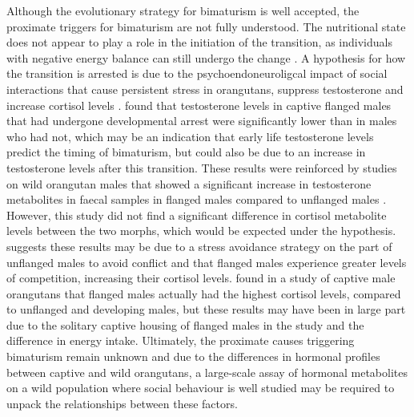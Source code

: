 Although the evolutionary strategy for bimaturism is well accepted, the proximate triggers for bimaturism are not fully understood. The nutritional state does not appear to play a role in the initiation of the transition, as individuals with negative energy balance can still undergo the change \citep{Prasetyo.2021}. A hypothesis for how the transition is arrested is due to the psychoendoneuroligcal impact of social interactions that cause persistent stress in orangutans, suppress testosterone and increase cortisol levels \citep{Kingsley.1982}. \citet{Thompson.2012} found that testosterone levels in captive flanged males that had undergone developmental arrest were significantly lower than in males who had not, which may be an indication that early life testosterone levels predict the timing of bimaturism, but could also be due to an increase in testosterone levels after this transition. These results were reinforced by studies on wild orangutan males that showed a significant increase in testosterone metabolites in faecal samples in flanged males compared to unflanged males \citep{Marty.2015rzq}. However, this study did not find a significant difference in cortisol metabolite levels between the two morphs, which would be expected under the hypothesis. \citet{Marty.2015} suggests these results may be due to a stress avoidance strategy on the part of unflanged males to avoid conflict and that flanged males experience greater levels of competition, increasing their cortisol levels. \citet{Prasetyo.2021} found in a study of captive male orangutans that flanged males actually had the highest cortisol levels, compared to unflanged and developing males, but these results may have been in large part due to the solitary captive housing of flanged males in the study and the difference in energy intake. Ultimately, the proximate causes triggering bimaturism remain unknown and due to the differences in hormonal profiles between captive and wild orangutans, a large-scale assay of hormonal metabolites on a wild population where social behaviour is well studied may be required to unpack the relationships between these factors.

